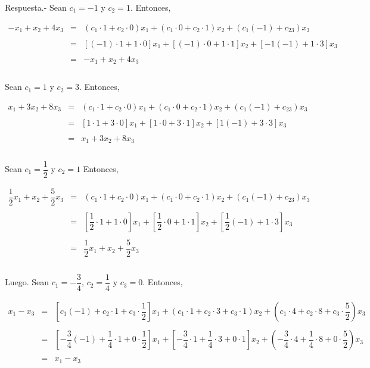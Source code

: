 \begin{enumerate}[\bfseries 1.]
	Respuesta.-\; Sean $c_1=-1$ y $c_2=1$. Entonces,

	$$\begin{array}{rcl}
	    -x_1+x_2+4x_3 &=& (c_1\cdot 1+c_2\cdot 0)x_1+(c_1\cdot 0 + c_2\cdot 1)x_2 + (c_1(-1)+c_23)x_3\\\\
			  &=& \left[(-1)\cdot 1+1\cdot 0\right]x_1+\left[(-1)\cdot 0+1\cdot 1\right]x_2+\left[-1(-1)+1\cdot 3\right]x_3\\\\
			  &=& -x_1+x_2+4x_3\\\\
	\end{array}$$

	Sean $c_1=1$ y $c_2=3$. Entonces,

	$$\begin{array}{rcl}
	    x_1+3x_2+8x_3 &=& (c_1\cdot 1+c_2\cdot 0)x_1+(c_1\cdot 0 + c_2\cdot 1)x_2 + (c_1(-1)+c_23)x_3\\\\
			  &=& \left[1\cdot 1+3\cdot 0\right]x_1+\left[1\cdot 0+3\cdot 1\right]x_2+\left[1(-1)+3\cdot 3\right]x_3\\\\
			  &=& x_1+3x_2+8x_3\\\\
	\end{array}$$

	Sean $c_1=\dfrac{1}{2}$ y $c_2=1$ Entonces,

	$$\begin{array}{rcl}
	    \dfrac{1}{2}x_1+x_2+\dfrac{5}{2}x_3 &=& (c_1\cdot 1+c_2\cdot 0)x_1+(c_1\cdot 0 + c_2\cdot 1)x_2 + (c_1(-1)+c_23)x_3\\\\
	    			  &=& \left[\dfrac{1}{2}\cdot 1+1\cdot 0\right]x_1+\left[\dfrac{1}{2}\cdot 0+1\cdot 1\right]x_2+\left[\dfrac{1}{2}(-1)+1\cdot 3\right]x_3\\\\
				  	    			  &=& \dfrac{1}{2}x_1+x_2+\dfrac{5}{2}x_3\\\\
	\end{array}$$

	Luego. Sean $c_1=-\dfrac{3}{4}$, $c_2=\dfrac{1}{4}$ y $c_3=0$. Entonces, 

	$$\begin{array}{rcl}
	    x_1-x_3 &=& \left[c_1(-1)+c_2\cdot 1 + c_3\cdot \dfrac{1}{2}\right]x_1+(c_1\cdot 1 + c_2\cdot 3 + c_3\cdot 1)x_2+\left(c_1 \cdot 4+c_2\cdot 8 + c_3\cdot \dfrac{5}{2}\right)x_3\\\\
	    		    &=& \left[-\dfrac{3}{4}(-1)+\dfrac{1}{4}\cdot 1 + 0\cdot \dfrac{1}{2}\right]x_1+\left[-\dfrac{3}{4}\cdot 1 + \dfrac{1}{4}\cdot 3 + 0\cdot 1\right]x_2+\left(-\dfrac{3}{4} \cdot 4+\dfrac{1}{4}\cdot 8 + 0\cdot \dfrac{5}{2}\right)x_3\\\\
			    &=&x_1-x_3\\\\
	\end{array}$$ 


\end{enumerate}
